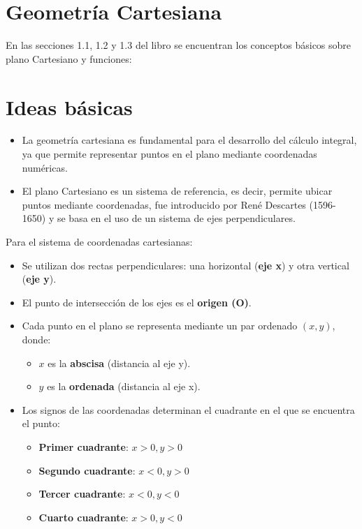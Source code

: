 \section{Geometría Cartesiana}
En las secciones 1.1, 1.2 y 1.3 del libro \cite{4} se encuentran los conceptos básicos sobre plano Cartesiano y funciones:

\section*{Ideas básicas}
\begin{itemize}
    \item La geometría cartesiana es fundamental para el desarrollo del cálculo integral, ya que permite representar puntos en el plano mediante coordenadas numéricas.
    \item El plano Cartesiano es un sistema de referencia, es decir, permite ubicar puntos mediante coordenadas, fue introducido por René Descartes (1596-1650) y se basa en el uso de un sistema de ejes perpendiculares.
\end{itemize}

Para el sistema de coordenadas cartesianas:
\begin{itemize}
    \item Se utilizan dos rectas perpendiculares: una horizontal (\textbf{eje x}) y otra vertical (\textbf{eje y}).
    \item El punto de intersección de los ejes es el \textbf{origen (O)}.
    \item Cada punto en el plano se representa mediante un par ordenado $(x,y)$, donde:
    \begin{itemize}
        \item $x$ es la \textbf{abscisa} (distancia al eje y).
        \item $y$ es la \textbf{ordenada} (distancia al eje x).
    \end{itemize}
    \item Los signos de las coordenadas determinan el cuadrante en el que se encuentra el punto:
    \begin{itemize}
        \item \textbf{Primer cuadrante}: $x > 0, y > 0$
        \item \textbf{Segundo cuadrante}: $x < 0, y > 0$
        \item \textbf{Tercer cuadrante}: $x < 0, y < 0$
        \item \textbf{Cuarto cuadrante}: $x > 0, y < 0$
    \end{itemize}
\end{itemize}

